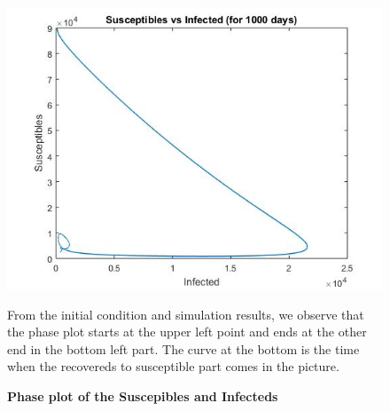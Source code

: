 \documentclass[prl,12pt,citeautoscript,reprint]{revtex4-1}
\begin{document}
\begin{figure}[H]
\begin{center}
\includegraphics[scale=0.33]{n2}
\begin{minipage}{0.45\textwidth} 
{\footnotesize  From the initial condition and simulation results, we observe that the phase plot starts at the upper left point and ends at the other end in the bottom left part. The curve at the bottom is the time when the recovereds to susceptible part comes in the picture.
\par}
\end{minipage}
 \caption{\textbf{Phase plot of the Suscepibles and Infecteds}}
  \label{fig:bn}
\end{center}
\end{figure}
\end{document}
